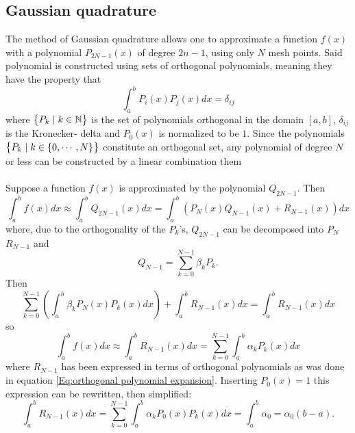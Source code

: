 \documentclass[10pt,a4paper]{article}
\begin{document}
\subsection{Gaussian quadrature}
The method of Gaussian quadrature allows one to approximate a function $f(x)$ with a polynomial $P_{2N-1}(x)$ of degree $2n-1$, using only $N$ mesh points. Said polynomial is constructed using sets of orthogonal polynomials, meaning they have the property that
\begin{equation}
\int_a^b P_i(x)P_j(x)dx = \delta_{ij}
\end{equation}
where $\big\{ P_k\hspace{1mm}|\hspace{1mm} k \in \mathbb N \big\}$ is the set of polynomials orthogonal in the domain $[a,b]$, $\delta_{ij}$ is the Kronecker- delta and $P_0(x)$ is normalized to be $1$. Since the polynomials $\big\{ P_k\hspace{1mm}|\hspace{1mm} k \in \{0,\cdots ,N\} \big\}$ constitute an orthogonal set, any polynomial of degree $N$ or less can be constructed by a linear combination them\\\\Suppose a function $f(x)$ is approximated by the polynomial $Q_{2N-1}$. Then
\begin{equation}\label{Eq:Poly approximation}
\int_{a}^bf(x)dx \approx \int_{a}^bQ_{2N-1}(x)dx=\int_{a}^b\left(P_N(x)Q_{N-1}(x)+R_{N-1}(x)\right)dx
\end{equation}
where, due to the orthogonality of the $P_k$'s, $Q_{2N-1}$ can be decomposed into $P_N$ $R_{N-1}$ and 
\begin{equation}\label{Eq:orthogonal polynomial expansion}
Q_{N-1} = \sum\limits_{k=0}^{N-1} \beta_k P_k.
\end{equation}
Then
$$
\sum\limits_{k=0}^{N-1} \left( \int_{a}^b \beta_k P_N(x) P_k(x)dx \right)+\int_{a}^bR_{N-1}(x)dx = \int_{a}^bR_{N-1}(x)dx
$$
so
\begin{equation*}
\int_{a}^bf(x)dx \approx \int_{a}^bR_{N-1}(x)dx = \sum\limits_{k=0}^{N-1}  \int_{a}^b \alpha_k P_k(x)dx
\end{equation*}
where $R_{N-1}$ has been expressed in terms of orthogonal polynomials as was done in equation \ref{Eq:orthogonal polynomial expansion}.
Inserting $P_0(x) = 1$ this expression can be rewritten, then simplified:
\begin{equation}\label{Eq: integral as a function of a0}
\int_{a}^bR_{N-1}(x)dx = \sum\limits_{k=0}^{N-1}  \int_{a}^b \alpha_kP_0(x) P_k(x)dx = \int_{a}^b \alpha_0 = \alpha_0(b-a).
\end{equation}
\end{document}
